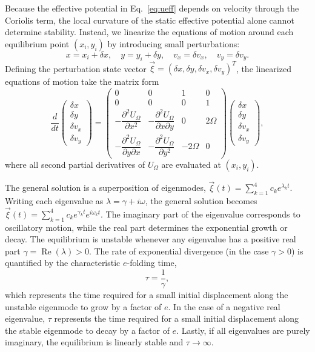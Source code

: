 \documentclass[12pt, letterpaper]{article}
\begin{document}
Because the effective potential in Eq.~\eqref{eq:ueff} depends on velocity through the Coriolis term, the local curvature of the static effective potential alone cannot determine stability. Instead, we linearize the equations of motion around each equilibrium point $(x_i, y_i)$ by introducing small perturbations:
$$
x = x_i + \delta x, \quad y = y_i + \delta y, \quad v_x = \delta v_x, \quad v_y = \delta v_y.
$$
Defining the perturbation state vector $\vec{\xi} = (\delta x, \delta y, \delta v_x, \delta v_y)^T$, the linearized equations of motion take the matrix form
\begin{equation}
\frac{d}{dt}
\begin{pmatrix} \delta x \\ \delta y \\ \delta v_x \\ \delta v_y \end{pmatrix}
=
\begin{pmatrix}
0 & 0 & 1 & 0 \\
0 & 0 & 0 & 1 \\
-\dfrac{\partial^2 U_\Omega}{\partial x^2} & -\dfrac{\partial^2 U_\Omega}{\partial x \partial y} & 0 & 2\Omega \\
-\dfrac{\partial^2 U_\Omega}{\partial y \partial x} & -\dfrac{\partial^2 U_\Omega}{\partial y^2} & -2\Omega & 0
\end{pmatrix}
\begin{pmatrix} \delta x \\ \delta y \\ \delta v_x \\ \delta v_y \end{pmatrix},
\label{eq:linearized}
\end{equation}
where all second partial derivatives of $U_\Omega$ are evaluated at $(x_i, y_i)$.

The general solution is a superposition of eigenmodes, $\vec{\xi}(t) = \sum_{k=1}^4 c_k e^{\lambda_k t}$. Writing each eigenvalue as $\lambda = \gamma + i\omega$, the general solution becomes $\vec{\xi}(t) = \sum_{k=1}^4 c_k e^{\gamma_k t}e^{i\omega_k t}.$ The imaginary part of the eigenvalue corresponds to oscillatory motion, while the real part determines the exponential growth or decay. The equilibrium is unstable whenever any eigenvalue has a positive real part $\gamma = \operatorname{Re}(\lambda) > 0$. The rate of exponential divergence (in the case $\gamma > 0$) is quantified by the characteristic $e$-folding time,
$$
\tau = \frac{1}{\gamma},
$$
which represents the time required for a small initial displacement along the unstable eigenmode to grow by a factor of $e$. In the case of a negative real eigenvalue, $\tau$ represents the time required for a small initial displacement along the stable eigenmode to decay by a factor of $e$. Lastly, if all eigenvalues are purely imaginary, the equilibrium is linearly stable and $\tau \to \infty$.
\end{document}
